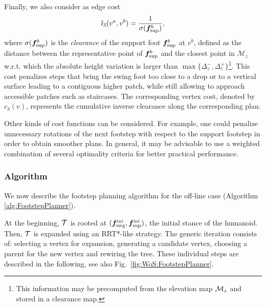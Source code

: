 Finally, we  also consider as edge cost
\begin{equation}
l_3(v^a, v^b) = \frac{1}{\sigma ({\bm{f}}^b_{\rm sup})},
\label{eq:WoS:costClearance}
\end{equation}
where $\sigma ({\bm{f}}^b_{\rm sup})$ is the {\em clearance} of the support foot ${\bm{f}}^b_{\rm sup}$ at $v^b$, defined as the distance between the representative point of ${\bm{f}}^b_{\rm sup}$ and the closest point in $\mathcal{M}_z$
w.r.t. which the absolute height variation is larger than $\max\{\Delta_z^-, \Delta_z^+\}$\footnote{This information may be precomputed from the elevation map ${\cal M}_z$ and stored in a clearance map.}.
This cost penalizes steps that bring the swing foot too close to a drop or to a vertical surface leading to a contiguous higher patch,
while still allowing to approach accessible patches such as staircases.
The corresponding vertex cost, denoted by $c_3(v)$, represents the cumulative inverse clearance along the corresponding plan.

Other kinds of cost functions can be considered. For example, one could penalize unnecessary rotations of the next footstep with respect to the support footstep in order to obtain smoother plans.  
In general, it may be advisable to use a weighted combination of several optimality criteria for better practical performance. 

\medskip

\subsubsection{Algorithm}
\label{sec:WoS:offlineCase:FP:PlannerOverview}

We now describe the footstep planning algorithm for the off-line case (Algorithm \ref{alg:FootstepPlanner}).

At the beginning, $\cal T$ is rooted at $({\bm{f}}_{\rm swg}^{\rm ini}, {\bm{f}}_{\rm sup}^{\rm ini})$, the initial stance of the humanoid.
Then, $\cal T$ is expanded using an RRT*-like strategy. The generic iteration consists of: selecting a vertex for expansion, generating a candidate vertex, choosing a parent for the new vertex and rewiring the tree. These individual steps are described in the following, see also Fig.~\ref{fig:WoS:FootstepPlanner}.

